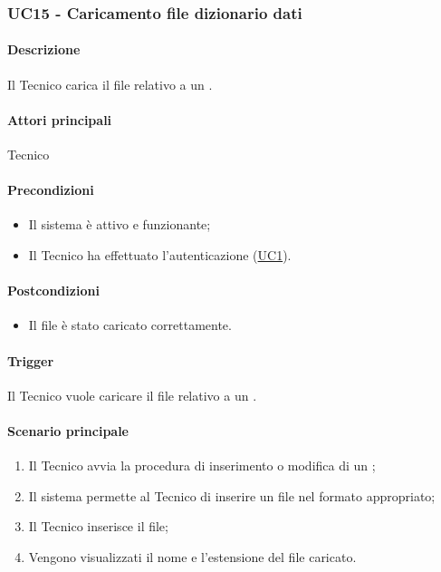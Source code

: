 \subsubsection{UC15 - Caricamento file dizionario dati}\label{UC15}

\paragraph*{Descrizione}
Il Tecnico carica il file relativo a un .

\paragraph*{Attori principali}
Tecnico

\paragraph*{Precondizioni}
\begin{itemize}
  \item Il sistema è attivo e funzionante;
  \item Il Tecnico ha effettuato l'autenticazione (\hyperref[UC1]{UC1}).
\end{itemize}

\paragraph*{Postcondizioni}
\begin{itemize}
  \item Il file è stato caricato correttamente.
\end{itemize}

\paragraph*{Trigger}
Il Tecnico vuole caricare il file relativo a un .

\paragraph*{Scenario principale}
\begin{enumerate}
  \item Il Tecnico avvia la procedura di inserimento o modifica di un ;
  \item Il sistema permette al Tecnico di inserire un file nel formato appropriato;
  \item Il Tecnico inserisce il file;
  \item Vengono visualizzati il nome e l'estensione del file caricato.
\end{enumerate}
